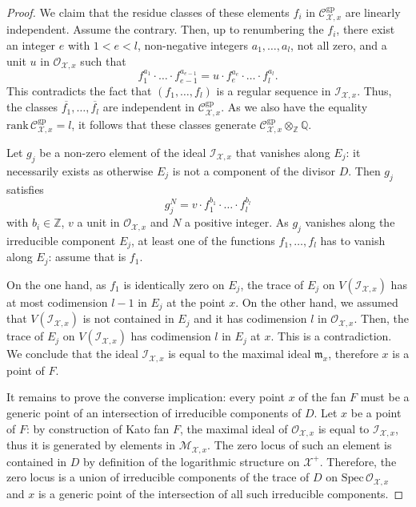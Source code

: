 \documentclass{amsart}%
\numberwithin{equation}{subsection}
\theoremstyle{plain2}
\theoremstyle{definition2}
\theoremstyle{stepstyle}
\theoremstyle{point}
\theoremstyle{subpoint}
\newcommand{\Z}{\ensuremath{\mathbb{Z}}}
\newcommand{\Q}{\ensuremath{\mathbb{Q}}}
\newcommand{\cX}{\ensuremath{\mathscr{X}}}
\newcommand{\caC}{\ensuremath{\mathcal{C}}}
\newcommand{\caO}{\ensuremath{\mathcal{O}}}
\newcommand{\caI}{\ensuremath{\mathcal{I}}}
\newcommand{\Spec}{\ensuremath{\mathrm{Spec}\,}}
\newcommand{\gp}{\mathrm{gp}}
\begin{document}
\begin{proof}
We claim that the residue classes of these elements $f_i$ in $\mathcal{C}_{\cX,x}^{\gp}$ are linearly independent. Assume the contrary. Then, up to renumbering the $f_i$, there exist an  integer $e$ with $1< e< l$, non-negative integers $a_1,\ldots,a_l$, not all zero, and a unit $u$ in $\mathcal{O}_{\cX,x}$ such that $$f_1^{a_1}\cdot \ldots \cdot f_{e-1}^{a_{e-1}}=u\cdot f_e^{a_e}\cdot \ldots \cdot f_l^{a_l}.$$ This contradicts the fact that $(f_1,\ldots,f_l)$ is a regular sequence in $\mathcal{I}_{\cX,x}$. Thus, the classes $\overline{f_1}, \ldots,\overline{f_l}$ are independent in $\caC_{\cX,x}^\gp$. As we also have the equality $\mathrm{rank}\,\mathcal{C}^{\gp}_{\cX,x}=l$, it follows that these classes generate $\caC_{\cX,x}^\gp \otimes_{\Z} \Q$.

Let $g_j$ be a non-zero element of the ideal $\caI_{\cX,x}$ that vanishes along $E_j$: it necessarily exists as otherwise $E_j$ is not a component of the divisor $D$. Then $g_j$ satisfies $$g_{j}^N = v \cdot f_1^{b_1} \cdot \ldots \cdot f_l^{b_l}$$ with $b_i \in \Z$, $v$ a unit in $\caO_{\cX,x}$ and $N$ a positive integer. As $g_j$ vanishes along the irreducible component $E_j$, at least one of the functions $f_1,\ldots,f_l$ has to vanish along $E_j$: assume that is $f_1$.

On the one hand, as $f_1$ is identically zero on $E_j$, the trace of $E_j$ on $V(\caI_{\cX,x})$ has at most codimension $l-1$ in $E_j$ at the point $x$. On the other hand, we assumed that $V(\caI_{\cX,x})$ is not contained in $E_j$ and it has codimension $l$ in $\caO_{\cX,x}$. Then, the trace of $E_j$ on $V(\caI_{\cX,x})$ has codimension $l$ in $E_j$ at $x$. This is a contradiction. We conclude that the ideal $\caI_{\cX,x}$ is equal to the maximal ideal $\mathfrak{m}_x$, therefore $x$ is a point of $F$.

It remains to prove the converse implication: every point $x$ of the fan $F$ must be a generic point of an intersection of irreducible components of $D$. Let $x$ be a point of $F$: by construction of Kato fan $F$, the maximal ideal of $\mathcal{O}_{\cX,x}$ is equal to $\mathcal{I}_{\cX,x}$, thus it is generated by elements in $\mathcal{M}_{\cX,x}$. The zero locus of such an element is contained in $D$ by definition of the logarithmic structure on $\cX^+$. Therefore, the zero locus is a union of irreducible components of the trace of $D$ on $\Spec \mathcal{O}_{\cX,x}$ and $x$ is a generic point of the intersection of all such irreducible components.
\end{proof}
\end{document}
